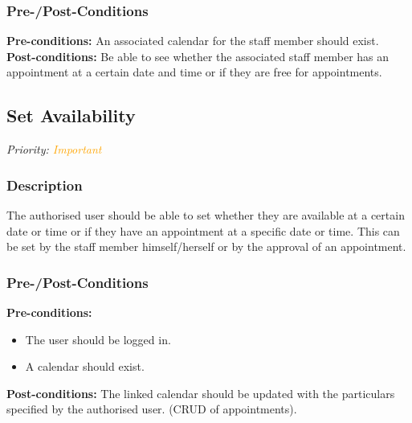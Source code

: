 	\subsubsection{Pre-/Post-Conditions}
		\textbf{Pre-conditions:} An associated calendar for the staff member should exist.\\
		\textbf{Post-conditions:} Be able to see whether the associated staff member has an appointment at a certain date and time or if they are free for appointments. 
	
\subsection{Set Availability}
\textit{Priority: \textcolor{orange}{Important}}
	\subsubsection{Description}
	The authorised user should be able to set whether they are available at a certain date or time or if they have an appointment at a specific date or time. This can be set by the staff member himself/herself or by the approval of an appointment.\\
	\subsubsection{Pre-/Post-Conditions}
		\textbf{Pre-conditions:} 
		\begin{itemize}
			\item The user should be logged in.
		 	\item A calendar should exist.
		\end{itemize}
		\textbf{Post-conditions:} The linked calendar should be updated with the particulars specified by the authorised user. (CRUD of appointments).